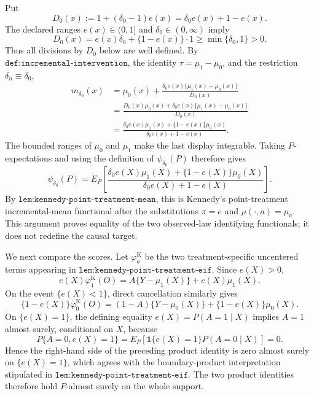 Put
\[
D_0(x):=1+(\delta_0-1)e(x)=\delta_0e(x)+1-e(x).
\]
The declared ranges \(e(x)\in(0,1]\) and \(\delta_0\in(0,\infty)\) imply
\[
D_0(x)=e(x)\delta_0+\{1-e(x)\}\cdot 1
\geq \min\{\delta_0,1\}>0.
\]
Thus all divisions by \(D_0\) below are well defined.  By
\(\texttt{def:incremental-intervention}\), the identity
\(\tau=\mu_1-\mu_0\), and the restriction \(\delta_n\equiv\delta_0\),
\[
\begin{aligned}
m_{\delta_0}(x)
&=\mu_0(x)+
  \frac{\delta_0e(x)\{\mu_1(x)-\mu_0(x)\}}{D_0(x)}\\
&=\frac{D_0(x)\mu_0(x)
  +\delta_0e(x)\{\mu_1(x)-\mu_0(x)\}}{D_0(x)}\\
&=\frac{\delta_0e(x)\mu_1(x)+\{1-e(x)\}\mu_0(x)}
        {\delta_0e(x)+1-e(x)}.
\end{aligned}
\]
The bounded ranges of \(\mu_0\) and \(\mu_1\) make the last display
integrable.  Taking \(P\)-expectations and using the definition of
\(\psi_{\delta_0}(P)\) therefore gives
\[
\psi_{\delta_0}(P)
=E_P\!\left[
\frac{\delta_0e(X)\mu_1(X)+\{1-e(X)\}\mu_0(X)}
     {\delta_0e(X)+1-e(X)}
\right].
\]
By \(\texttt{lem:kennedy-point-treatment-mean}\), this is Kennedy's
point-treatment incremental-mean functional after the substitutions
\(\pi=e\) and \(\mu(\cdot,a)=\mu_a\).  This argument proves equality of
the two observed-law identifying functionals; it does not redefine the
causal target.

We next compare the scores.  Let \(\varphi_a^{\mathrm K}\) be the two
treatment-specific uncentered terms appearing in
\(\texttt{lem:kennedy-point-treatment-eif}\).  Since \(e(X)>0\),
\[
e(X)\varphi_1^{\mathrm K}(O)
=A\{Y-\mu_1(X)\}+e(X)\mu_1(X).
\]
On the event \(\{e(X)<1\}\), direct cancellation similarly gives
\[
\{1-e(X)\}\varphi_0^{\mathrm K}(O)
=(1-A)\{Y-\mu_0(X)\}+\{1-e(X)\}\mu_0(X).
\]
On \(\{e(X)=1\}\), the defining equality
\(e(X)=P(A=1\mid X)\) implies \(A=1\) almost surely, conditional on
\(X\), because
\[
P\{A=0,e(X)=1\}
=E_P\!\left[\mathbf 1\{e(X)=1\}P(A=0\mid X)\right]=0.
\]
Hence the right-hand side of the preceding product identity is zero
almost surely on \(\{e(X)=1\}\), which agrees with the boundary-product
interpretation stipulated in
\(\texttt{lem:kennedy-point-treatment-eif}\).  The two product identities
therefore hold \(P\)-almost surely on the whole support.


